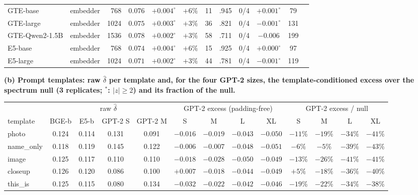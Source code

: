\begin{table}[H]
\begin{tabular}{llrccccccc|cc}
GTE-base & embedder & 768 & $0.076$ & $+0.004^{\circ}$ & $+6\%$ & 11 & .945 & 0/4 & $+0.001^{\circ}$ & 79 \\
GTE-large & embedder & 1024 & $0.075$ & $+0.003^{\circ}$ & $+3\%$ & 36 & .821 & 0/4 & $-0.001^{\circ}$ & 131 \\
GTE-Qwen2-1.5B & embedder & 1536 & $0.078$ & $+0.002^{\circ}$ & $+3\%$ & 58 & .711 & 0/4 & $-0.006$ & 199 \\
E5-base & embedder & 768 & $0.074$ & $+0.004^{\circ}$ & $+6\%$ & 15 & .925 & 0/4 & $+0.000^{\circ}$ & 97 \\
E5-large & embedder & 1024 & $0.071$ & $+0.002^{\circ}$ & $+3\%$ & 44 & .781 & 0/4 & $-0.001^{\circ}$ & 119 \\
\bottomrule
\end{tabular}
\par\vspace{5pt}
\endgroup
\begingroup
\noindent\textbf{(b) Prompt templates: raw $\hat\delta$ per template and, for the four GPT-2 sizes, the template-conditioned excess over the spectrum null (3 replicates; $^*$: $|z|\ge2$) and its fraction of the null.}\par\vspace{1.5pt}
\setlength{\tabcolsep}{1.8pt}
\begin{tabular}{lcccc|cccc|cccc}
\toprule
 & \multicolumn{4}{c|}{raw $\hat\delta$} & \multicolumn{4}{c|}{GPT-2 excess (padding-free)} & \multicolumn{4}{c}{GPT-2 excess / null} \\
template & BGE-b & E5-b & GPT-2 S & GPT-2 M & S & M & L & XL & S & M & L & XL \\
\midrule
photo & 0.124 & 0.114 & 0.131 & 0.091 & $-0.016$\rlap{$^*$} & $-0.019$\rlap{$^*$} & $-0.043$\rlap{$^*$} & $-0.050$\rlap{$^*$} & $-11\%$ & $-19\%$ & $-34\%$ & $-41\%$ \\
name\_only & 0.118 & 0.119 & 0.145 & 0.122 & $-0.006$ & $-0.007$ & $-0.048$\rlap{$^*$} & $-0.051$\rlap{$^*$} & $-6\%$ & $-5\%$ & $-39\%$ & $-43\%$ \\
image & 0.125 & 0.117 & 0.110 & 0.110 & $-0.018$\rlap{$^*$} & $-0.028$\rlap{$^*$} & $-0.050$\rlap{$^*$} & $-0.049$\rlap{$^*$} & $-13\%$ & $-26\%$ & $-41\%$ & $-41\%$ \\
closeup & 0.126 & 0.120 & 0.086 & 0.100 & $+0.007$ & $-0.018$\rlap{$^*$} & $-0.044$\rlap{$^*$} & $-0.049$\rlap{$^*$} & $+5\%$ & $-18\%$ & $-36\%$ & $-40\%$ \\
this\_is & 0.125 & 0.115 & 0.080 & 0.134 & $-0.032$\rlap{$^*$} & $-0.022$\rlap{$^*$} & $-0.042$\rlap{$^*$} & $-0.046$\rlap{$^*$} & $-19\%$ & $-22\%$ & $-34\%$ & $-38\%$ \\

\end{tabular}
\end{table}
